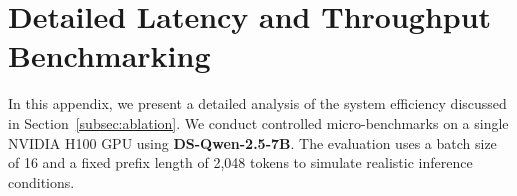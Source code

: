 \documentclass[11pt]{article}
\theoremstyle{plain}
\begin{document}
    


\section{Detailed Latency and Throughput Benchmarking}
\label{app:latency_details}

In this appendix, we present a detailed analysis of the system efficiency discussed in Section~\ref{subsec:ablation}.
We conduct controlled micro-benchmarks on a single NVIDIA H100 GPU using \textbf{DS-Qwen-2.5-7B}.
The evaluation uses a batch size of 16 and a fixed prefix length of 2,048 tokens to simulate realistic inference conditions.
\end{document}
